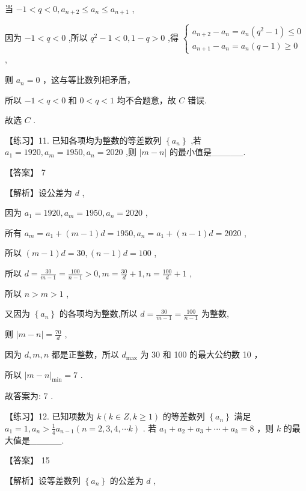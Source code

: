 \documentclass[10pt]{article}
\newcommand*\circled[1]{\tikz[baseline=(char.base)]{\node[shape=circle,draw,inner sep=1.5pt] (char) {\small #1};}}
\begin{document}
 \circled{3}  当 \(- 1 < q < 0,{a}_{n + 2} \leq  {a}_{n} \leq  {a}_{n + 1}\) ,

因为 \(- 1 < q < 0\) ,所以 \({q}^{2} - 1 < 0,1 - q > 0\) ,得 \(\left\{  \begin{array}{l} {a}_{n + 2} - {a}_{n} = {a}_{n}\left( {{q}^{2} - 1}\right)  \leq  0 \\  {a}_{n + 1} - {a}_{n} = {a}_{n}\left( {q - 1}\right)  \geq  0 \end{array}\right.\) ,

则 \({a}_{n} = 0\) ，这与等比数列相矛盾，

所以 \(- 1 < q < 0\) 和 \(0 < q < 1\) 均不合题意，故 \(C\) 错误.

故选 \(C\) .

【练习】11. 已知各项均为整数的等差数列 \(\left\{  {a}_{n}\right\}\) ,若 \({a}_{1} = {1920},{a}_{m} = {1950},{a}_{n} = {2020}\) ,则 \(\left| {m - n}\right|\) 的最小值是\_\_\_\_\_.

【答案】 7

【解析】设公差为 \(d\) ,

因为 \({a}_{1} = {1920},{a}_{m} = {1950},{a}_{n} = {2020}\) ,

所有 \({a}_{m} = {a}_{1} + \left( {m - 1}\right) d = {1950},{a}_{n} = {a}_{1} + \left( {n - 1}\right) d = {2020}\) ,

所以 \(\left( {m - 1}\right) d = {30},\left( {n - 1}\right) d = {100}\) ,

所以 \(d = \frac{30}{m - 1} = \frac{100}{n - 1} > 0,m = \frac{30}{d} + 1,n = \frac{100}{d} + 1\) ,

所以 \(n > m > 1\) ,

又因为 \(\left\{  {a}_{n}\right\}\) 的各项均为整数,所以 \(d = \frac{30}{m - 1} = \frac{100}{n - 1}\) 为整数,

则 \(\left| {m - n}\right|  = \frac{70}{d}\) ,

因为 \(d,m,n\) 都是正整数，所以 \({d}_{\max }\) 为 30 和 100 的最大公约数 10 ，

所以 \({\left| m - n\right| }_{\min } = 7\) .

故答案为: 7 .

【练习】12. 已知项数为 \(k\left( {k \in  Z,k \geq  1}\right)\) 的等差数列 \(\left\{  {a}_{n}\right\}\) 满足 \({a}_{1} = 1,{a}_{n} > \frac{1}{4}{a}_{n - 1}\left( {n = 2,3,4,\cdots k}\right)\) . 若 \({a}_{1} + {a}_{2} + {a}_{3} + \cdots  + {a}_{k} = 8\) ，则 \(k\) 的最大值是\_\_\_\_\_.

【答案】 15

【解析】设等差数列 \(\left\{  {a}_{n}\right\}\) 的公差为 \(d\) ,
\end{document}
